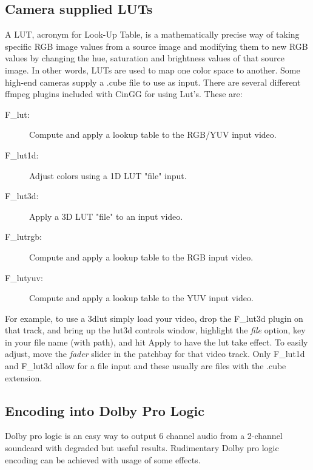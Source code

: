 \subsection{Camera supplied LUTs}%
\label{sub:camera_supplied_luts}

A LUT, acronym for Look-Up Table, is a mathematically precise way of taking specific RGB image values from a source image and modifying them to new RGB values by changing the hue, saturation and brightness values of that source image. In other words, LUTs are used to map one color space to another.  Some high-end cameras supply a .cube file to use as input. There are several different ffmpeg plugins included with CinGG for using Lut's.  These are:

\begin{description}
	\item[F\_lut:] Compute and apply a lookup table to the RGB/YUV input video.
	\item[F\_lut1d:] Adjust colors using a 1D LUT "file" input.
	\item[F\_lut3d:] Apply a 3D LUT "file" to an input video.
	\item[F\_lutrgb:] Compute and apply a lookup table to the RGB input video.
	\item[F\_lutyuv:] Compute and apply a lookup table to the YUV input video.
\end{description}

For example, to use a 3dlut simply load your video, drop the F\_lut3d plugin on that track, and bring up the lut3d controls window, highlight the \textit{file} option, key in your file name (with path), and hit Apply to have the lut take effect.  To easily adjust, move the \textit{fader} slider in the patchbay for that video track. Only F\_lut1d and F\_lut3d allow for a file input and these usually are files with the .cube extension.

\subsection{Encoding into Dolby Pro Logic}%
\label{sub:encoding_dolby_pro_logic}

Dolby pro logic is an easy way to output 6 channel audio from a 2-channel soundcard with degraded but useful results. Rudimentary Dolby pro logic encoding can be achieved with usage of some effects.

